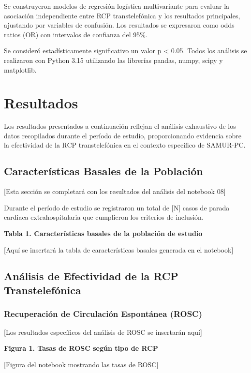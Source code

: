 \documentclass[10pt,a4paper]{article}
\begin{document}
\begin{multicols}{2}
Se construyeron modelos de regresión logística multivariante para evaluar la asociación independiente entre RCP transtelefónica y los resultados principales, ajustando por variables de confusión. Los resultados se expresaron como odds ratios (OR) con intervalos de confianza del 95\%.

Se consideró estadísticamente significativo un valor p < 0.05. Todos los análisis se realizaron con Python 3.15 utilizando las librerías pandas, numpy, scipy y matplotlib.

\section{Resultados}

Los resultados presentados a continuación reflejan el análisis exhaustivo de los datos recopilados durante el período de estudio, proporcionando evidencia sobre la efectividad de la RCP transtelefónica en el contexto específico de SAMUR-PC.

\subsection{Características Basales de la Población}

[Esta sección se completará con los resultados del análisis del notebook 08]

Durante el período de estudio se registraron un total de [N] casos de parada cardiaca extrahospitalaria que cumplieron los criterios de inclusión.

\textbf{Tabla 1. Características basales de la población de estudio}

[Aquí se insertará la tabla de características basales generada en el notebook]

\subsection{Análisis de Efectividad de la RCP Transtelefónica}

\subsubsection{Recuperación de Circulación Espontánea (ROSC)}

[Los resultados específicos del análisis de ROSC se insertarán aquí]

\textbf{Figura 1. Tasas de ROSC según tipo de RCP}

[Figura del notebook mostrando las tasas de ROSC]


\end{multicols}
\end{document}

